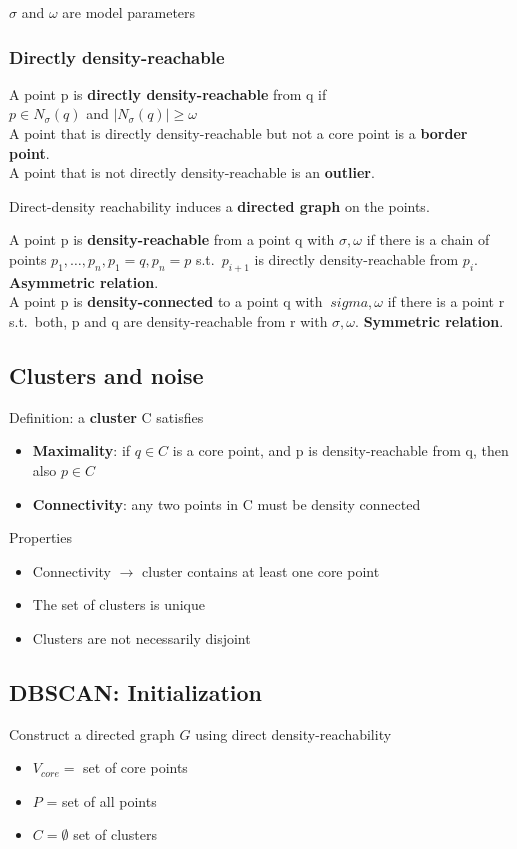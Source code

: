 $ \sigma $ and $ \omega $ are model parameters

\subsubsection{Directly density-reachable}
A point p is \textbf{directly density-reachable} from q if \\
$ p \in N_\sigma(q) $ and $ \mid N_\sigma (q) \mid \geq \omega $ \\
A point that is directly density-reachable but not a core point is a
\textbf{border point}. \\
A point that is not directly density-reachable is an \textbf{outlier}.

Direct-density reachability induces a \textbf{directed graph} on the
points.

A point p is \textbf{density-reachable} from a point q with $ \sigma,
\omega $ if there is a chain of points $ p_1, \ldots, p_n, p_1 = q,
p_n = p $ s.t.\ $ p_{i + 1} $ is directly density-reachable from $ p_i
$. \textbf{Asymmetric relation}. \\

A point p is \textbf{density-connected} to a point q with $\ sigma,
\omega $ if there is a point r s.t.\ both, p and q are
density-reachable from r with $ \sigma, \omega $. \textbf{Symmetric
  relation}.

\subsection{Clusters and noise}
Definition: a \textbf{cluster} C satisfies
\begin{itemize}
\item \textbf{Maximality}: if $ q \in C $ is a core point, and p is
  density-reachable from q, then also $ p \in C $
\item \textbf{Connectivity}: any two points in C must be density
  connected
\end{itemize}

Properties
\begin{itemize}
\item Connectivity $ \rightarrow $ cluster contains at least one core
  point
\item The set of clusters is unique
\item Clusters are not necessarily disjoint
\end{itemize}

\subsection{DBSCAN: Initialization}
Construct a directed graph $ G $ using direct density-reachability
\begin{itemize}
\item $ V_{core} = $ set of core points
\item $ P $ = set of all points
\item $ C = \emptyset $ set of clusters
\end{itemize}

